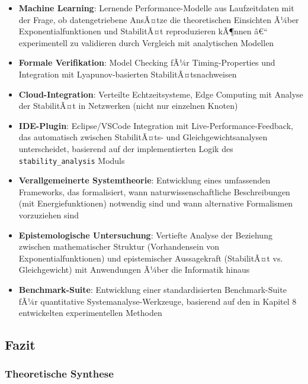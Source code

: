 ﻿\documentclass[a4paper,12pt]{scrreprt}
\theoremstyle{definition}
\begin{document}
\begin{itemize}
	\item[-] \textbf{Machine Learning}: Lernende Performance-Modelle aus Laufzeitdaten mit der Frage, ob datengetriebene AnsÃ¤tze die theoretischen Einsichten Ã¼ber Exponentialfunktionen und StabilitÃ¤t reproduzieren kÃ¶nnen â€“ experimentell zu validieren durch Vergleich mit analytischen Modellen
	
	\item[-] \textbf{Formale Verifikation}: Model Checking fÃ¼r Timing-Properties und Integration mit Lyapunov-basierten StabilitÃ¤tsnachweisen
	
	\item[-] \textbf{Cloud-Integration}: Verteilte Echtzeitsysteme, Edge Computing mit Analyse der StabilitÃ¤t in Netzwerken (nicht nur einzelnen Knoten)
	
	\item[-] \textbf{IDE-Plugin}: Eclipse/VSCode Integration mit Live-Performance-Feedback, das automatisch zwischen StabilitÃ¤ts- und Gleichgewichtsanalysen unterscheidet, basierend auf der implementierten Logik des \texttt{stability\_analysis} Moduls
	
	\item[-] \textbf{Verallgemeinerte Systemtheorie}: Entwicklung eines umfassenden Frameworks, das formalisiert, wann naturwissenschaftliche Beschreibungen (mit Energiefunktionen) notwendig sind und wann alternative Formalismen vorzuziehen sind
	
	\item[-] \textbf{Epistemologische Untersuchung}: Vertiefte Analyse der Beziehung zwischen mathematischer Struktur (Vorhandensein von Exponentialfunktionen) und epistemischer Aussagekraft (StabilitÃ¤t vs. Gleichgewicht) mit Anwendungen Ã¼ber die Informatik hinaus
	
	\item[-] \textbf{Benchmark-Suite}: Entwicklung einer standardisierten Benchmark-Suite fÃ¼r quantitative Systemanalyse-Werkzeuge, basierend auf den in Kapitel 8 entwickelten experimentellen Methoden
\end{itemize}

\subsection{Fazit}
\label{subsec:fazit}

\subsubsection{Theoretische Synthese}
\end{document}
